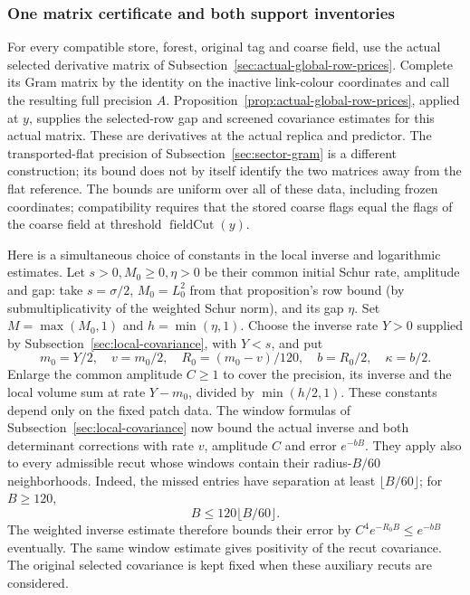 \subsubsection{One matrix certificate and both support inventories}

For every compatible store, forest, original tag and coarse field, use the
actual selected derivative matrix of
Subsection~\ref{sec:actual-global-row-prices}. Complete its Gram matrix by the
identity on the inactive link-colour coordinates and call the resulting
full precision $A$. Proposition~\ref{prop:actual-global-row-prices},
applied at $y$, supplies the selected-row gap and screened covariance
estimates for this actual matrix. These are
derivatives at the actual replica and predictor. The transported-flat precision of
Subsection~\ref{sec:sector-gram} is a different construction; its bound does
not by itself identify the two matrices away from the flat reference.
The bounds are uniform over all of these data, including frozen
coordinates; compatibility requires that the stored coarse flags equal
the flags of the coarse field at threshold $\operatorname{fieldCut}(y)$.

Here is a simultaneous choice of constants in the local inverse and
logarithmic estimates. Let $s>0,M_0\geq0,\eta>0$ be their common initial
Schur rate, amplitude and gap: take $s=\sigma/2$, $M_0=L_0^2$
from that proposition's row bound (by submultiplicativity of the
weighted Schur norm), and its gap $\eta$. Set $M=\max(M_0,1)$ and
$h=\min(\eta,1)$. Choose the inverse rate $Y>0$ supplied by
Subsection~\ref{sec:local-covariance}, with $Y<s$, and put
\[
 m_0=Y/2,\quad v=m_0/2,\quad
 R_0=(m_0-v)/120,\quad b=R_0/2,\quad \kappa=b/2.
\]
Enlarge the common amplitude $C\geq1$ to cover the precision, its inverse
and the local volume sum at rate $Y-m_0$, divided by
$\min(h/2,1)$. These constants depend only on the fixed patch data.
The window formulas of Subsection~\ref{sec:local-covariance} now bound the
actual inverse and both determinant corrections with rate $v$, amplitude
$C$ and error $e^{-bB}$. They apply also to every admissible recut whose
windows contain their radius-$B/60$ neighborhoods. Indeed, the missed
entries have separation at least $\lfloor B/60\rfloor$; for $B\geq120$,
\[
 B\leq120\lfloor B/60\rfloor.
\]
The weighted inverse estimate therefore bounds their error by
$C^4e^{-R_0B}\leq e^{-bB}$ eventually. The same window estimate gives
positivity of the recut covariance. The original selected covariance is
kept fixed when these auxiliary recuts are considered.

